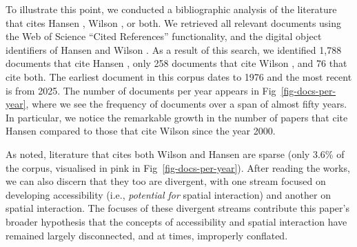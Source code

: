 \documentclass[
  10pt,
  letterpaper,
]{article}
\begin{document}
To illustrate this point, we conducted a bibliographic analysis of the
literature that cites Hansen \citep{hansen1959}, Wilson
\citep{wilson1971}, or both. We retrieved all relevant documents using
the Web of Science ``Cited References'' functionality, and the digital
object identifiers of Hansen \citep{hansen1959} and Wilson
\citep{wilson1971}. As a result of this search, we identified 1,788
documents that cite Hansen \citep{hansen1959}, only 258 documents that
cite Wilson \citep{wilson1971}, and 76 that cite both. The earliest
document in this corpus dates to 1976 and the most recent is from 2025.
The number of documents per year appears in Fig~\ref{fig-docs-per-year},
where we see the frequency of documents over a span of almost fifty
years. In particular, we notice the remarkable growth in the number of
papers that cite Hansen \citep{hansen1959} compared to those that cite
Wilson \citep{wilson1971} since the year 2000.

As noted, literature that cites both Wilson \citep{wilson1971} and
Hansen \citep{hansen1959} are sparse (only 3.6\% of the corpus,
visualised in pink in Fig~\ref{fig-docs-per-year}). After reading the
works, we can also discern that they too are divergent, with one stream
focused on developing accessibility (i.e., \emph{potential for} spatial
interaction) and another on spatial interaction. The focuses of these
divergent streams contribute this paper's broader hypothesis that the
concepts of accessibility and spatial interaction have remained largely
disconnected, and at times, improperly conflated.
\end{document}
